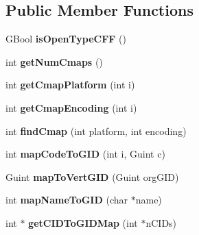 \subsection*{Public Member Functions}
\begin{DoxyCompactItemize}
\item 
\mbox{\label{class_fo_fi_true_type_a03e32bb9f67fda72ae062de9c299aea1}} 
G\+Bool {\bfseries is\+Open\+Type\+C\+FF} ()
\item 
\mbox{\label{class_fo_fi_true_type_a2fd88637ba638abc5a63dc369304233a}} 
int {\bfseries get\+Num\+Cmaps} ()
\item 
\mbox{\label{class_fo_fi_true_type_aacbd31292c8c05a0a9ceabb542fa8d30}} 
int {\bfseries get\+Cmap\+Platform} (int i)
\item 
\mbox{\label{class_fo_fi_true_type_a99ddc115f6af803b5853873a703fe250}} 
int {\bfseries get\+Cmap\+Encoding} (int i)
\item 
\mbox{\label{class_fo_fi_true_type_a0098c657456045bf56816ac37207027d}} 
int {\bfseries find\+Cmap} (int platform, int encoding)
\item 
\mbox{\label{class_fo_fi_true_type_a339e4e26ff575df42bdecffb5479e268}} 
int {\bfseries map\+Code\+To\+G\+ID} (int i, Guint c)
\item 
\mbox{\label{class_fo_fi_true_type_ac54afd051d7ee81fc0f1ea02689905c4}} 
Guint {\bfseries map\+To\+Vert\+G\+ID} (Guint org\+G\+ID)
\item 
\mbox{\label{class_fo_fi_true_type_a9347a45c834ff20f652c7d190e1cfa42}} 
int {\bfseries map\+Name\+To\+G\+ID} (char $\ast$name)
\item 
\mbox{\label{class_fo_fi_true_type_aaec01e2043cf9ad751ca749c9055ad70}} 
int $\ast$ {\bfseries get\+C\+I\+D\+To\+G\+I\+D\+Map} (int $\ast$n\+C\+I\+Ds)
\item 
\mbox{\label{class_fo_fi_true_type_a144ce59223d3da36035f61adeca9b19c}} 

\end{DoxyCompactItemize}

